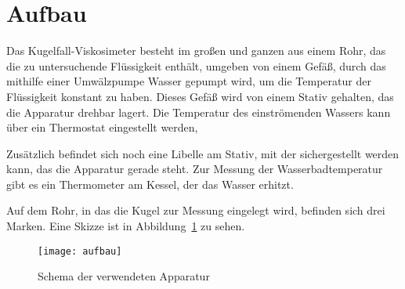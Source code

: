 
\section{Aufbau}

Das Kugelfall-Viskosimeter besteht im großen und ganzen aus einem Rohr,
das die zu untersuchende Flüssigkeit enthält, umgeben von einem Gefäß,
durch das mithilfe einer Umwälzpumpe Wasser gepumpt wird, um die
Temperatur der Flüssigkeit konstant zu haben. Dieses Gefäß wird von
einem Stativ gehalten, das die Apparatur drehbar lagert. Die Temperatur
des einströmenden Wassers kann über ein Thermostat eingestellt werden,

Zusätzlich befindet sich noch eine Libelle am Stativ, mit der
sichergestellt werden kann, das die Apparatur gerade steht.  Zur Messung
der Wasserbadtemperatur gibt es ein Thermometer am Kessel, der das
Wasser erhitzt.

Auf dem Rohr, in das die Kugel zur Messung eingelegt wird, befinden sich
drei Marken. Eine Skizze ist in Abbildung~\ref{fig:aufbau} zu sehen.

\begin{figure}
  \centering
  \texttt{[image: aufbau]}
  \caption{Schema der verwendeten Apparatur}
  \label{fig:aufbau}
\end{figure}
